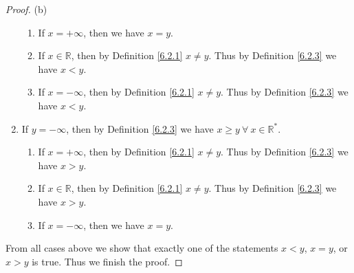 \begin{proof}{(b)}
\begin{enumerate}[label=(\Roman*)]
    \begin{enumerate}[label=(\roman*)]
        \item If \(x = +\infty\), then we have \(x = y\).
        \item If \(x \in \mathds{R}\), then by Definition \ref{6.2.1} \(x \neq y\).
        Thus by Definition \ref{6.2.3} we have \(x < y\).
        \item If \(x = -\infty\), then by Definition \ref{6.2.1} \(x \neq y\).
        Thus by Definition \ref{6.2.3} we have \(x < y\).
    \end{enumerate}
    \item If \(y = -\infty\), then by Definition \ref{6.2.3} we have \(x \geq y \ \forall\ x \in \mathds{R}^*\).
    \begin{enumerate}[label=(\roman*)]
        \item If \(x = +\infty\), then by Definition \ref{6.2.1} \(x \neq y\).
        Thus by Definition \ref{6.2.3} we have \(x > y\).
        \item If \(x \in \mathds{R}\), then by Definition \ref{6.2.1} \(x \neq y\).
        Thus by Definition \ref{6.2.3} we have \(x > y\).
        \item If \(x = -\infty\), then we have \(x = y\).
    \end{enumerate}
\end{enumerate}
From all cases above we show that exactly one of the statements \(x < y\), \(x = y\), or \(x > y\) is true.
Thus we finish the proof.
\end{proof}


